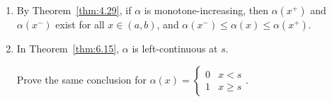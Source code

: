 \begin{remark}
	\begin{enumerate}
		\item By Theorem~\ref{thm:4.29}, if $\alpha$ is monotone-increasing,
		      then $\alpha(x^{+})$ and $\alpha(x^{-})$ exist for all $x \in (a,b)$, and $\alpha({x^{-}})\le \alpha(x)\le \alpha(x^{+})$.
		\item In Theorem~\ref{thm:6.15}, $\alpha$ is left-continuous at $s$.
		      \begin{exercise}
			      Prove the same conclusion for $\alpha(x)=\begin{cases}
					      0 & x<s    \\
					      1 & x\ge s
				      \end{cases}$.
		      \end{exercise}
	\end{enumerate}
\end{remark}

